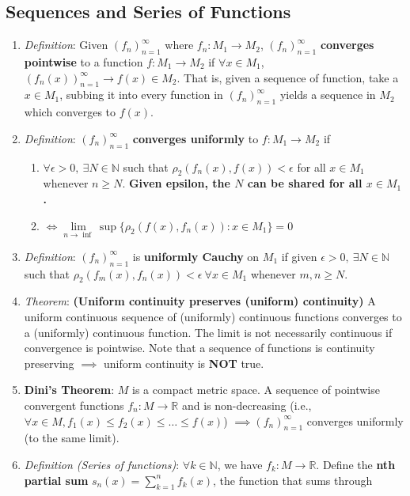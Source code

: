\documentclass[10pt]{article}
\newcommand{\seqn}[1]{(#1)^\infty_{n=1}}
\newcommand{\real}{\mathbb{R}}
\newcommand{\nat}{\mathbb{N}}
\begin{document}
\begin{multicols*}{3}
	\section{Sequences and Series of Functions}
	\begin{enumerate}
		\item \emph{Definition}: Given $\seqn{f_{n}}$ where $f_{n}:M_{1}\to M_{2}$,
		$\seqn{f_{n}}$ \textbf{converges pointwise} to a function
		$f:M_{1} \to M_{2}$ if $\forall x\in M_{1}$,
		$\seqn{f_{n}(x)}\to f(x)\in M_{2}$. That is, given a sequence of function,
		take a $x\in M_{1}$, subbing it into every function in $\seqn{f_{n}}$ yields
		a sequence in $M_{2}$ which converges to $f(x)$.
		\item \emph{Definition}: $\seqn{f_{n}}$ \textbf{converges uniformly} to
		$f:M_{1}\to M_{2}$ if
		\begin{enumerate}
			\item $\forall\epsilon>0,\ \exists N\in\nat$ such that
				$\rho_{2}(f_{n}(x), f(x))<\epsilon$ for all $x\in M_{1}$ whenever
				$n\geq N$. \textbf{Given epsilon, the $N$ can be shared for all
				$x\in M_{1}$.}
			\item
				$\iff \lim\limits_{n\to\inf}\sup\{\rho_{2}(f(x),f_{n}(x)):x\in M_{1}\}=0$
		\end{enumerate}
		\item \emph{Definition}: $\seqn{f_{n}}$ is \textbf{uniformly Cauchy} on
		$M_{1}$ if given $\epsilon>0,\ \exists N\in\nat$ such that
		$\rho_{2}(f_{m}(x),f_{n}(x))<\epsilon\ \forall x\in M_{1}$ whenever $m,n\geq N$.
		\item \emph{Theorem}: \textbf{(Uniform continuity preserves (uniform)
			continuity)} A uniform continuous sequence of (uniformly) continuous
			functions converges to a (uniformly) continuous function. The limit is not
			necessarily continuous if convergence is pointwise. Note that a sequence
			of functions is continuity preserving $\implies$ uniform continuity is
			\textbf{NOT} true.
		\item \textbf{Dini's Theorem}: $M$ is a compact metric space. A sequence of
			pointwise convergent functions $f_{n}:M\to\real$ and is non-decreasing
			(i.e., $\forall x\in M, f_{1}(x)\leq f_{2}(x)\leq\dots\leq f(x)$)
			$\implies \seqn{f_{n}}$ converges uniformly (to the same limit).
		\item \emph{Definition (Series of functions)}: $\forall k\in\nat$, we have
			$f_{k}:M\to\real$. Define the \textbf{nth partial sum}
			$s_{n}(x) = \sum\limits^{n}_{k=1}f_{k}(x)$, the function that sums through

\end{enumerate}
\end{multicols*}
\end{document}
